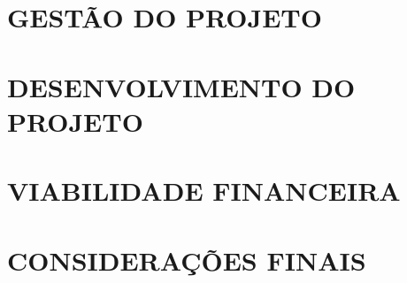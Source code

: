 \documentclass[
12pt,				%
openany,			%
oneside,			%
a4paper,			%
english,			%
french,				%
spanish,			%
brazil				%
chapter=TITLE %
]{abntex2}
\begin{document}
	\cleardoublepage
	\chapter{GESTÃO DO PROJETO}
	
	
	
	\addtocounter{chapter}{-1}
	\chapter{DESENVOLVIMENTO DO PROJETO}
	
	
	\cleardoublepage
	\chapter{VIABILIDADE FINANCEIRA}
	
	
	\cleardoublepage
	\chapter{CONSIDERAÇÕES FINAIS}
	

	
	\renewcommand{\bibname}{REFERÊNCIAS} %
	
	
	
	
	
	
	
		
		
\end{document}
